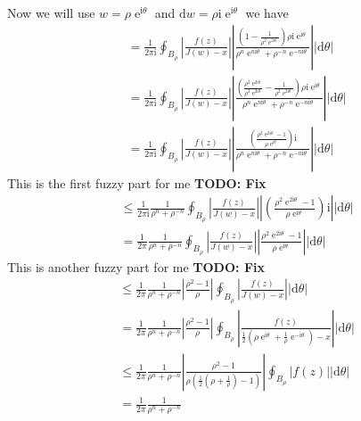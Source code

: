 \documentclass[10pt]{amsart}
\newcommand{\D}{\mathrm{d}}
\newcommand{\I}{\mathrm{i}}
\DeclareMathOperator{\E}{e}
\theoremstyle{nonumberplain}
\begin{document}
\begin{enumerate}[label={\bf {\arabic*}:}]
\begin{enumerate}
Now we will use $w = \rho \E^{\I \theta}$ and $\D w = \rho \I \E^{\I \theta}$ we have
\begin{align*}
&= \frac 1 {2 \pi \I}
	\oint_{B_\rho}
		\left| \frac{ f(z)}{J(w) - x} \right|
		\left| \frac {\left( 1 - \frac 1 {\rho^2\E^{2 \I \theta}} \right) \rho \I \E^{\I \theta}}  { \rho^n\E^{n \I \theta} + \rho^{-n}\E^{-n \I \theta} } \right|
		|\D \theta| \\
&= \frac 1 {2 \pi \I}
	\oint_{B_\rho}
		\left| \frac{ f(z)}{J(w) - x} \right|
		\left| \frac {\left( \frac {\rho^2\E^{2 \I \theta}}{\rho^2\E^{2 \I \theta}} - \frac 1 {\rho^2\E^{2 \I \theta}} \right) \rho \I \E^{\I \theta}}  { \rho^n\E^{n \I \theta} + \rho^{-n}\E^{-n \I \theta} } \right|
		|\D \theta| \\
&= \frac 1 {2 \pi \I}
	\oint_{B_\rho}
		\left| \frac{ f(z)}{J(w) - x} \right|
		\left| \frac {\left( \frac {\rho^2\E^{2 \I \theta} - 1}{\rho \E^{ \I \theta}}\right) \I }  { \rho^n\E^{n \I \theta} + \rho^{-n}\E^{-n \I \theta} } \right|
		|\D \theta|
\end{align*}
This is the first fuzzy part for me \textbf{TODO: Fix}
\begin{align*}
&\leq \frac 1 {2 \pi \I}
	\frac 1 { \rho^n + \rho^{-n} }
	\oint_{B_\rho}
		\left| \frac{ f(z)}{J(w) - x} \right|
		\left| \left( \frac {\rho^2\E^{2 \I \theta} - 1}{\rho \E^{ \I \theta}}\right) \I  \right|
		|\D \theta| \\
&= \frac 1 {2 \pi }
	\frac 1 { \rho^n + \rho^{-n} }
	\oint_{B_\rho}
		\left| \frac{ f(z)}{J(w) - x} \right|
		\left| \frac {\rho^2\E^{2 \I \theta} - 1}{\rho \E^{ \I \theta}} \right|
		|\D \theta|
\end{align*}
This is another fuzzy part for me \textbf{TODO: Fix}
\begin{align*}
&\leq \frac 1 {2 \pi }
	\frac 1 { \rho^n + \rho^{-n} }
	\left| \frac {\rho^2 - 1}{\rho} \right|
	\oint_{B_\rho}
		\left| \frac{ f(z)}{J(w) - x} \right|
		|\D \theta| \\
&= \frac 1 {2 \pi }
	\frac 1 { \rho^n + \rho^{-n} }
	\left| \frac {\rho^2 - 1}{\rho} \right|
	\oint_{B_\rho}
		\left| \frac{ f(z)}{\frac 1 2 \left( \rho \E^{\I \theta } + \frac 1 \rho \E^{-\I \theta } \right) - x} \right|
		|\D \theta| \\
&\leq \frac 1 {2 \pi }
	\frac 1 { \rho^n + \rho^{-n} }
	\left| \frac {\rho^2 - 1} { \rho \left( \frac 1 2 \left( \rho + \frac 1 \rho \right) - 1 \right)} \right|
	\oint_{B_\rho}
		\left| f(z) \right|
		|\D \theta| \\
&= \frac 1 {2 \pi }
	\frac 1 { \rho^n + \rho^{-n} }

\end{align*}
\end{enumerate}
\end{enumerate}
\end{document}
